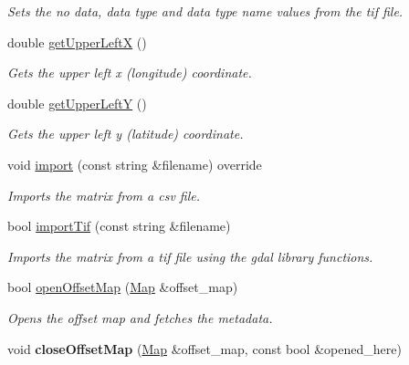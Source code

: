 \begin{DoxyCompactItemize}
\begin{DoxyCompactList}\small\item\em Sets the no data, data type and data type name values from the tif file. \end{DoxyCompactList}\item 
double \hyperlink{class_map_afd32790ea28d0c5aa99b582b2d474933}{get\+Upper\+LeftX} ()
\begin{DoxyCompactList}\small\item\em Gets the upper left x (longitude) coordinate. \end{DoxyCompactList}\item 
double \hyperlink{class_map_a2d7b63836d06b2710192e7c8afd38641}{get\+Upper\+LeftY} ()
\begin{DoxyCompactList}\small\item\em Gets the upper left y (latitude) coordinate. \end{DoxyCompactList}\item 
void \hyperlink{class_map_ad1a25204dce37addc3453e091552b014}{import} (const string \&filename) override
\begin{DoxyCompactList}\small\item\em Imports the matrix from a csv file. \end{DoxyCompactList}\item 
bool \hyperlink{class_map_a2306683b0b3b4ddb7d776d1ff60d4491}{import\+Tif} (const string \&filename)
\begin{DoxyCompactList}\small\item\em Imports the matrix from a tif file using the gdal library functions. \end{DoxyCompactList}\item 
bool \hyperlink{class_map_ade20cc1876ba2774f0f8274d432d89c3}{open\+Offset\+Map} (\hyperlink{class_map}{Map} \&offset\+\_\+map)
\begin{DoxyCompactList}\small\item\em Opens the offset map and fetches the metadata. \end{DoxyCompactList}\item 
void {\bfseries close\+Offset\+Map} (\hyperlink{class_map}{Map} \&offset\+\_\+map, const bool \&opened\+\_\+here)\hypertarget{class_map_a39d76e341e0f817d65ddf0100cfe5f26}{}\label{class_map_a39d76e341e0f817d65ddf0100cfe5f26}


\end{DoxyCompactItemize}
